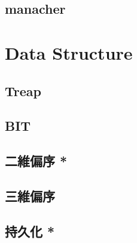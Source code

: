 \documentclass[a4paper,10pt,twocolumn,oneside]{article}
\begin{document}
\subsection{manacher}


% 

%

% 

\section{Data Structure}

\subsection{Treap}


\subsection{BIT}


\subsection{二維偏序 *}


\subsection{三維偏序}


\subsection{持久化 *}

\end{document}
